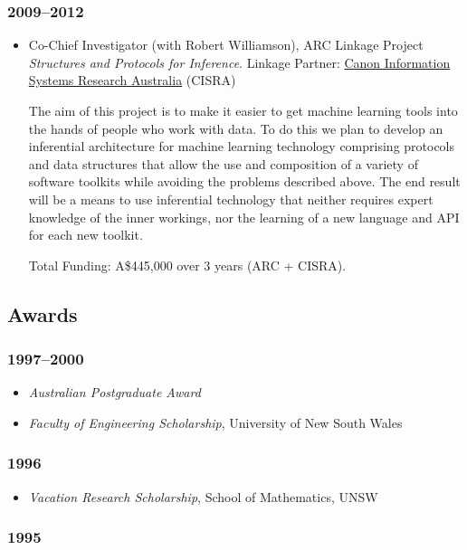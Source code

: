 \documentclass{article}
\begin{document}
\hypertarget{20092012}{}\subsubsection*{{2009--{}2012}}\label{20092012}

\begin{itemize}%
\item Co-Chief Investigator (with Robert Williamson), ARC Linkage Project \emph{Structures and Protocols for Inference}. Linkage Partner: \href{http://www.cisra.com.au/}{Canon Information Systems Research Australia} (CISRA)

The aim of this project is to make it easier to get machine learning tools into the hands of people who work with data. To do this we plan to develop an inferential architecture for machine learning technology comprising protocols and data structures that allow the use and composition of a variety of software toolkits while avoiding the problems described above. The end result will be a means to use inferential technology that neither requires expert knowledge of the inner workings, nor the learning of a new language and API for each new toolkit.

Total Funding: A\$445,000 over 3 years (ARC + CISRA).



\end{itemize}
\hypertarget{awards}{}\subsection*{{Awards}}\label{awards}

\hypertarget{19972000}{}\subsubsection*{{1997--{}2000}}\label{19972000}

\begin{itemize}%
\item \emph{Australian Postgraduate Award}
\item \emph{Faculty of Engineering Scholarship}, University of New South Wales

\end{itemize}
\hypertarget{1996}{}\subsubsection*{{1996}}\label{1996}

\begin{itemize}%
\item \emph{Vacation Research Scholarship}, School of Mathematics, UNSW

\end{itemize}
\hypertarget{1995}{}\subsubsection*{{1995}}\label{1995}
\end{document}
